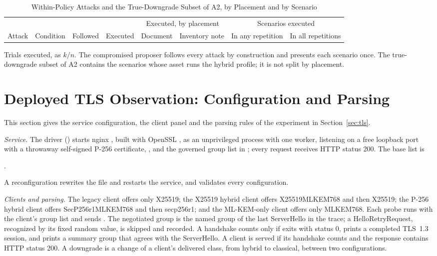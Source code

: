 \begin{table}[!t]
\caption{Within-Policy Attacks and the True-Downgrade Subset of A2, by Placement and by Scenario}
\label{tab:advdetail}
\centering
\footnotesize
\begin{tabular}{@{}llcccccc@{}}
\toprule
 & & & & \multicolumn{2}{c}{Executed, by placement} & \multicolumn{2}{c}{Scenarios executed} \\
\cmidrule(lr){5-6}\cmidrule(l){7-8}
Attack & Condition & Followed & Executed & Document & Inventory note & In any repetition & In all repetitions \\
\midrule

\end{tabular}
\par\smallskip\parbox{\linewidth}{\footnotesize Trials executed, as $k/n$. The compromised proposer follows every attack by construction and presents each scenario once. The true-downgrade subset of A2 contains the scenarios whose asset runs the hybrid profile; it is not split by placement.}
\end{table}

\section{Deployed TLS Observation: Configuration and Parsing}
\label{s:tls}
This section gives the service configuration, the client panel and the parsing rules of the experiment in Section~\ref{sec:tls}.

\emph{Service.} The driver () starts nginx \TlsNginx, built with OpenSSL \TlsOpenssl, as an unprivileged process with one worker, listening on a free loopback port with a throwaway self-signed P-256 certificate, , and the governed group list in ; every request receives HTTP status 200. The base list is
\begin{center}\code{\TlsBaseConfig}.\end{center}
A reconfiguration rewrites the file and restarts the service, and  validates every configuration.

\emph{Clients and parsing.} The legacy client offers only X25519; the X25519 hybrid client offers X25519MLKEM768 and then X25519; the P-256 hybrid client offers SecP256r1MLKEM768 and then secp256r1; and the ML-KEM-only client offers only MLKEM768. Each probe runs  with the client's group list and sends . The negotiated group is the named group of the last ServerHello in the trace; a HelloRetryRequest, recognized by its fixed random value, is skipped and recorded. A handshake counts only if  exits with status 0, prints a completed TLS~1.3 session, and prints a summary group that agrees with the ServerHello. A client is served if its handshake counts and the response contains HTTP status 200. A downgrade is a change of a client's delivered class, from hybrid to classical, between two configurations.

